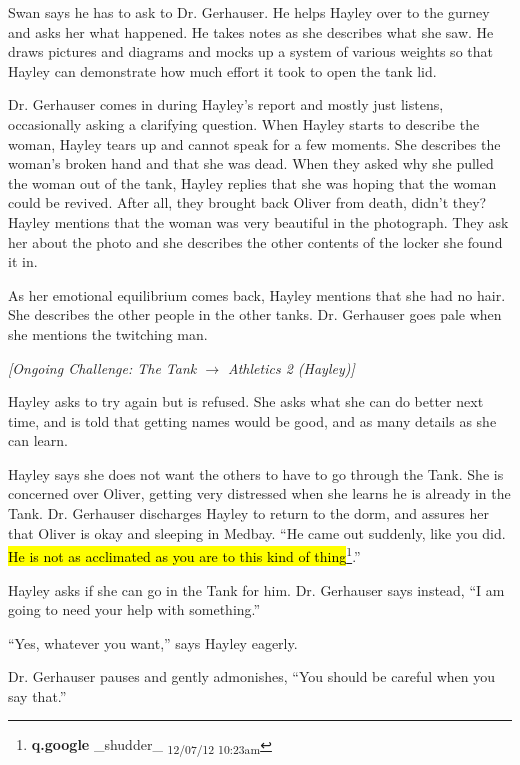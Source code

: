 Swan says he has to ask to Dr. Gerhauser.  He helps Hayley over to the gurney and asks her what happened.  He takes notes as she describes what she saw.  He draws pictures and diagrams and mocks up a system of various weights so that Hayley can demonstrate how much effort it took to open the tank lid.



Dr. Gerhauser comes in during Hayley's report and mostly just listens, occasionally asking a clarifying question.  When Hayley starts to describe the woman, Hayley tears up and cannot speak for a few moments.  She describes the woman's broken hand and that she was dead.  When they asked why she pulled the woman out of the tank, Hayley replies that she was hoping that the woman could be revived. After all, they brought back Oliver from death, didn't they?  Hayley mentions that the woman was very beautiful in the photograph.  They ask her about the photo and she describes the other contents of the locker she found it in.



As her emotional equilibrium comes back, Hayley mentions that she had no hair.  She describes the other people in the other tanks.  Dr. Gerhauser goes pale when she mentions the twitching man.



\textit{{[}Ongoing Challenge: The Tank $\rightarrow$ Athletics 2 (Hayley){]}}



Hayley asks to try again but is refused.  She asks what she can do better next time, and is told that getting names would be good, and as many details as she can learn.



Hayley says she does not want the others to have to go through the Tank.  She is concerned over Oliver, getting very distressed when she learns he is already in the Tank.  Dr. Gerhauser discharges Hayley to return to the dorm, and assures her that Oliver is okay and sleeping in Medbay.  ``He came out suddenly, like you did.  \hl{He is not as acclimated as you are to this kind of thing}\footnote{\textbf{q.google }\_shudder\_ \textsubscript{12/07/12 10:23am}}.''



Hayley asks if she can go in the Tank for him.  Dr. Gerhauser says instead, ``I am going to need your help with something.''

``Yes, whatever you want,'' says Hayley eagerly.

Dr. Gerhauser pauses and gently admonishes, ``You should be careful when you say that.''

